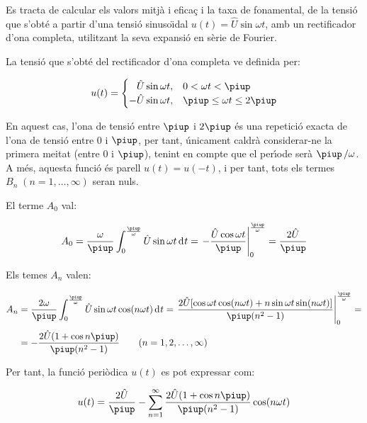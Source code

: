\begin{exemple}
    Es tracta de calcular els valors mitj\`{a} i efica\c{c} i la taxa de
    fonamental, de la tensi\'{o} que s'obt\'{e} a partir d'una tensi\'{o}
    sinuso\"{\i}dal $u(t) = \hat{U} \sin\omega t$, amb un rectificador d'ona
    completa, utilitzant la seva expansi\'{o} en s\`{e}rie de Fourier.

    La tensi\'{o} que s'obt\'{e} del rectificador d'ona completa ve definida
    per:

    \[
    u(t) = \begin{cases} \phantom{-}\hat{U} \sin\omega t, & 0 < \omega t < \piup\\
           -\hat{U} \sin\omega t, & \piup \leq \omega t \leq 2\piup \end{cases}
    \]

    En aquest cas, l'ona de tensi\'{o} entre $\piup$ i $2\piup$ \'{e}s una repetici\'{o}
    exacta de l'ona de tensi\'{o} entre 0 i $\piup$, per tant, \'{u}nicament
    caldr\`{a} considerar-ne la primera meitat (entre 0 i $\piup$), tenint en
    compte que el per\'{\i}ode ser\`{a} $\piup\,/\omega$. A m\'{e}s, aquesta funci\'{o} \'{e}s
    parell $u(t) = u(-t)$, i per tant, tots els termes
    $B_n\;(n=1,\ldots,\infty)$ seran nuls.

    El terme $A_0$ val:

    \[
    A_0 = \frac{\omega}{\piup} \int_0^{\frac{\piup}{\omega}} \hat{U} \sin
    \omega t \diff t = \left. -\frac{\hat{U} \cos \omega t}{\piup}
    \right|_0^{\frac{\piup}{\omega}} = \frac{2\hat{U}}{\piup}
    \]

    Els temes $A_n$ valen:

    \[
    \begin{split}
    A_n &= \frac{2 \omega}{\piup} \int_0^{\frac{\piup}{\omega}} \hat{U} \sin
    \omega t \cos(n \omega t)\diff t = \left. \frac{2 \hat{U}[ \cos
    \omega t \cos (n \omega t) + n \sin \omega t \sin(n \omega
    t)]}{\piup(n^2-1)} \right|_0^{\frac{\piup}{\omega}}=\\[0.5ex]
    &= -\frac{2\hat{U}(1+\cos n \piup)}{\piup(n^2-1)}
    \qquad(n=1,2,\ldots,\infty)
    \end{split}
    \]

    Per tant, la funci\'{o} peri\`{o}dica $u(t)$ es pot expressar com:

    \[
        u(t) = \frac{2\hat{U}}{\piup} - \sum_{n=1}^\infty
         \frac{2\hat{U}(1+\cos n \piup)}{\piup(n^2-1)} \cos(n \omega t)
    \]


\end{exemple}
